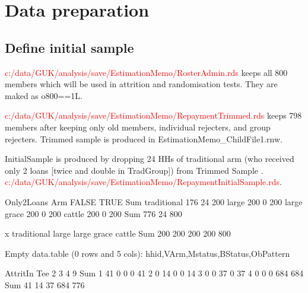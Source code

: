 \newpage


\section{Data preparation}

\subsection{Define initial sample}


\textcolor{red}{c:/data/GUK/analysis/save/EstimationMemo/RosterAdmin.rds} keeps all 800 members which will be used in attrition and randomisation tests. They are maked as \textsf{o800==1L}. 

\textcolor{red}{c:/data/GUK/analysis/save/EstimationMemo/RepaymentTrimmed.rds} keeps 798 members after keeping only old members, individual rejecters, and group rejecters. Trimmed sample is produced in \textsf{EstimationMemo\_ChildFile1.rnw}. 

\textsf{InitialSample} is produced by dropping 24 HHs of traditional arm (who received only 2 loans [twice and double in \textsf{TradGroup}]) from Trimmed Sample . \textcolor{red}{c:/data/GUK/analysis/save/EstimationMemo/RepaymentInitialSample.rds}. 



\begin{Schunk}
\begin{Soutput}
             Only2Loans
Arm           FALSE TRUE Sum
  traditional   176   24 200
  large         200    0 200
  large grace   200    0 200
  cattle        200    0 200
  Sum           776   24 800
\end{Soutput}
\begin{Soutput}
x
traditional       large large grace      cattle         Sum 
        200         200         200         200         800 
\end{Soutput}
\begin{Soutput}
Empty data.table (0 rows and 5 cols): hhid,VArm,Mstatus,BStatus,ObPattern
\end{Soutput}
\begin{Soutput}
     AttritIn
Tee     2   3   4   9 Sum
  1    41   0   0   0  41
  2     0  14   0   0  14
  3     0   0  37   0  37
  4     0   0   0 684 684
  Sum  41  14  37 684 776
\end{Soutput}
\end{Schunk}









